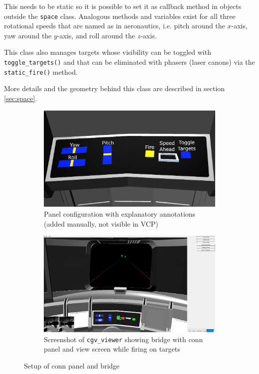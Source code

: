 \documentclass[hyperref, bachelorofscience]{cgvpub}
\begin{document}
This needs to be static so it is possible to set it as callback method in objects outside the \lstinline|space| class. Analogous methods and variables exist for all three rotational speeds that are named as in aeronautics, i.e. pitch around the $ x $-axis, yaw around the $ y $-axis, and roll around the $ z $-axis. 

This class also manages targets whose visibility can be toggled with \lstinline|toggle_targets()| and that can be eliminated with phasers (laser canons) via the \lstinline|static_fire()| method. 

More details and the geometry behind this class are described in section \ref{sec:space}.

\begin{figure}
	\begin{subfigure}{.49\linewidth}
		\includegraphics[width=\linewidth]{../pics/panel}
		\caption{Panel configuration with explanatory annotations (added manually, not visible in \gls{VCP})}
		\label{fig:panel}
	\end{subfigure}
	\hfill
	\begin{subfigure}{.49\linewidth}
		\includegraphics[width=\linewidth]{../pics/firing}
		\caption{Screenshot of \lstinline|cgv_viewer| showing bridge with conn panel and view screen while firing on targets}
		\label{fig:firing}
	\end{subfigure}
	\caption{Setup of conn panel and bridge}
\end{figure}
\end{document}
